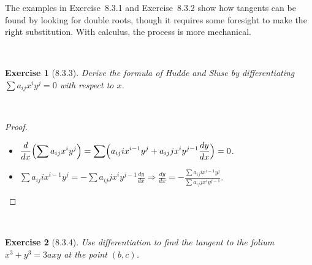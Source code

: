 \documentclass[12pt]{article}
\newcommand{\XB}{\color{black}}
\newcommand{\XBB}{\color{blue}}
\newcommand{\ds}{\displaystyle}
\theoremstyle{plain}
\newtheorem{ex}{Exercise}
\begin{document}
\newpage

The examples in Exercise~8.3.1 and Exercise~8.3.2 show how tangents can be found by looking for double roots, though it requires some foresight to make the right substitution. With calculus, the process is more mechanical.


\XBB\hrulefill\XB \\
\begin{ex} [8.3.3]
  Derive the formula of Hudde and Sluse by differentiating $ \sum a_{ij} x^{i} y^{j} = 0 $ with respect to $ x $.
\end{ex}
\XBB\hrulefill\XB \\

\begin{proof}
  \ \\

  \begin{itemize}
    \item $ \ds \frac{d}{dx} \Bigl( \sum a_{ij} x^{i} y^{j} \Bigr) =  \sum \Bigl( a_{ij}i x^{i-1} y^{j} + a_{ij}j x^{i} y^{j-1} \frac{dy}{dx} \Bigr) = 0 $.
    \item $ \ds \sum a_{ij} i x^{i-1} y^{j} = -\sum a_{ij} j x^{i} y^{j-1} \frac{dy}{dx} \Rightarrow \frac{dy}{dx} = -\frac{\ds \sum a_{ij} i x^{i-1} y^{j}}{\ds \sum a_{ij} j x^{i} y^{j-1}}$.
  \end{itemize}

\end{proof}

\newpage


\XBB\hrulefill\XB \\
\begin{ex} [8.3.4]
  Use differentiation to find the tangent to the folium $ x^{3} + y^{3} = 3axy $ at the point $ (b, c) $.
\end{ex}
\XBB\hrulefill\XB \\
\end{document}
